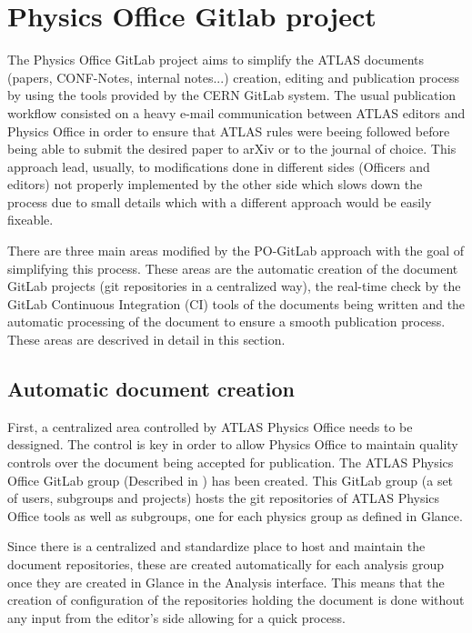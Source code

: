\section{Physics Office Gitlab project}
\label{sec:pogitlab}

The Physics Office GitLab project aims to simplify the ATLAS documents (papers, CONF-Notes, internal notes...) creation, editing and publication process by using the tools provided by the CERN GitLab system. The usual publication workflow consisted on a heavy e-mail communication between ATLAS editors and Physics Office in order to ensure that ATLAS rules were beeing followed before being able to submit the desired paper to arXiv or to the journal of choice. This approach lead, usually, to modifications done in different sides (Officers and editors) not properly implemented by the other side which slows down the process due to small details which with a different approach would be easily fixeable.

There are three main areas modified by the PO-GitLab approach with the goal of simplifying this process. These areas are the automatic creation of the document GitLab projects (git repositories in a centralized way), the real-time check by the GitLab Continuous Integration (CI) tools of the documents being written and the automatic processing of the document to ensure a smooth publication process. These areas are descrived in detail in this section.

\subsection{Automatic document creation}
First, a centralized area controlled by ATLAS Physics Office needs to be dessigned. The control is key in order to allow Physics Office to maintain quality controls over the document being accepted for publication. The ATLAS Physics Office GitLab group (Described in \Sect{\ref{sec:pogitlab-group}}) has been created. This GitLab group (a set of users, subgroups and projects) hosts the git repositories of ATLAS Physics Office tools as well as subgroups, one for each physics group as defined in Glance.

Since there is a centralized and standardize place to host and maintain the document repositories, these are created automatically for each analysis group once they are created in Glance in the Analysis interface. This means that the creation of configuration of the repositories holding the document is done without any input from the editor's side allowing for a quick process.

